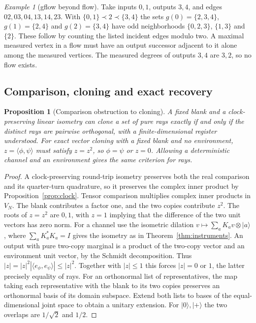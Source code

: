\documentclass[aps,pra,onecolumn,superscriptaddress,nofootinbib,10pt]{revtex4-2}
\newtheorem{proposition}[theorem]{Proposition}
\theoremstyle{definition}
\theoremstyle{remark}
\newtheorem{example}[theorem]{Example}
\begin{document}
\begin{example}[gflow beyond flow]\label{cp:gflowexample}
Take inputs $0,1$, outputs $3,4$, and edges $02,03,04,13,14,23$. With $\{0,1\}\prec2\prec\{3,4\}$ the sets $g(0)=\{2,3,4\}$, $g(1)=\{2,4\}$ and $g(2)=\{3,4\}$ have odd neighborhoods $\{0,2,3\}$, $\{1,3\}$ and $\{2\}$. These follow by counting the listed incident edges modulo two. A maximal measured vertex in a flow must have an output successor adjacent to it alone among the measured vertices. The measured degrees of outputs $3,4$ are $3,2$, so no flow exists.
\end{example}

\subsection{Comparison, cloning and exact recovery}

\begin{proposition}[Comparison obstruction to cloning]\label{cp:noclone}
A fixed blank and a clock-preserving linear isometry can clone a set of pure rays exactly if and only if the distinct rays are pairwise orthogonal, with a finite-dimensional register understood. For exact vector cloning with a fixed blank and no environment, $z=\langle\phi,\psi\rangle$ must satisfy $z=z^2$, so $\phi=\psi$ or $z=0$. Allowing a deterministic channel and an environment gives the same criterion for rays. \cite{n4:WZ,n4:Dieks}
\end{proposition}
\begin{proof}
A clock-preserving round-trip isometry preserves both the real comparison and its quarter-turn quadrature, so it preserves the complex inner product by Proposition~\ref{prop:clock}. Tensor comparison multiplies complex inner products in $V_N$. The blank contributes a factor one, and the two copies contribute $z^2$. The roots of $z=z^2$ are $0,1$, with $z=1$ implying that the difference of the two unit vectors has zero norm. For a channel use the isometric dilation $v\mapsto\sum_a K_av\otimes|a\rangle$, where $\sum_a K_a^*K_a=I$ gives the isometry as in Theorem~\ref{thm:instruments}. An output with pure two-copy marginal is a product of the two-copy vector and an environment unit vector, by the Schmidt decomposition. Thus $|z|=|z|^2|\langle e_\phi,e_\psi\rangle|\le |z|^2$. Together with $|z|\le1$ this forces $|z|=0$ or $1$, the latter precisely equality of rays. For an orthonormal list of representatives, the map taking each representative with the blank to its two copies preserves an orthonormal basis of its domain subspace. Extend both lists to bases of the equal-dimensional joint space to obtain a unitary extension. For $|0\rangle,|+\rangle$ the two overlaps are $1/\sqrt2$ and $1/2$.
\end{proof}
\end{document}
